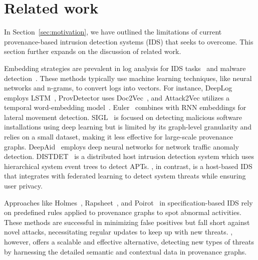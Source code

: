 \section{Related work}
\label{s:relwk}
In Section~\ref{sec:motivation}, we have outlined the limitations of current provenance-based intrusion detection systems (IDS) that \Sys seeks to overcome. This section further expands on the discussion of related work.

 Embedding strategies are prevalent in log analysis for IDS tasks~\cite{aljawarneh2018anomaly, maseer2021benchmarking, gyanchandani2012taxonomy,atlas} and malware detection~\cite{zolkipli2011approach, chakkaravarthy2019survey, isohara2011kernel}. These methods typically use machine learning techniques, like neural networks and n-grams, to convert logs into vectors. For instance, DeepLog employs LSTM~\cite{deeplog2017}, ProvDetector uses Doc2Vec~\cite{provdetector2020, le2014distributed}, and Attack2Vec utilizes a temporal word-embedding model~\cite{shen2019attack2vec}. Euler~\cite{king2022euler} combines \gnnshort with RNN embeddings for lateral movement detection. SIGL~\cite{sigl} is focused on detecting malicious software installations using deep learning but is limited by its graph-level granularity and relies on a small dataset, making it less effective for large-scale provenance graphs. DeepAid~\cite{deepaid} employs deep neural networks for network traffic anomaly detection. DISTDET~\cite{dong2023distdet} is a distributed host intrusion detection system which uses hierarchical system event trees to detect APTs. \Sys, in contrast, is a host-based IDS that integrates \gnnshort with federated learning to detect system threats while ensuring user privacy.

 Approaches like Holmes~\cite{holmes2019}, Rapsheet~\cite{rapsheet2020}, and Poirot~\cite{poirot2019} in specification-based IDS rely on predefined rules applied to provenance graphs to spot abnormal activities. These methods are successful in minimizing false positives but fall short against novel attacks, necessitating regular updates to keep up with new threats. \Sys, however, offers a scalable and effective alternative, detecting new types of threats by harnessing the detailed semantic and contextual data in provenance graphs.

 

 


 


